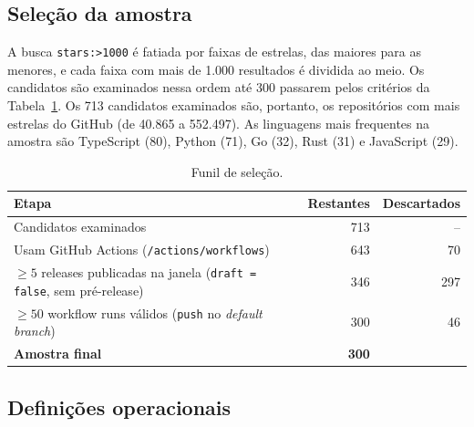 \documentclass[12pt]{article}
\begin{document}
\subsection{Seleção da amostra}

A busca \texttt{stars:>1000} é fatiada por faixas de estrelas, das maiores para as menores, e cada faixa com mais de 1.000 resultados é dividida ao meio. Os candidatos são examinados nessa ordem até 300 passarem pelos critérios da Tabela~\ref{tab:funil}. Os 713 candidatos examinados são, portanto, os repositórios com mais estrelas do GitHub (de 40.865 a 552.497). As linguagens mais frequentes na amostra são TypeScript (80), Python (71), Go (32), Rust (31) e JavaScript (29).

\begin{table}[ht]
\centering
\caption{Funil de seleção.}\label{tab:funil}
\small
\begin{tabular}{lrr}
\toprule
Etapa & Restantes & Descartados \\
\midrule
Candidatos examinados & 713 & -- \\
Usam GitHub Actions (\texttt{/actions/workflows}) & 643 & 70 \\
$\ge 5$ releases publicadas na janela (\texttt{draft = false}, sem pré-release) & 346 & 297 \\
$\ge 50$ workflow runs válidos (\texttt{push} no \textit{default branch}) & 300 & 46 \\
\textbf{Amostra final} & \textbf{300} & \\
\bottomrule
\end{tabular}
\end{table}

\subsection{Definições operacionais}
\end{document}
